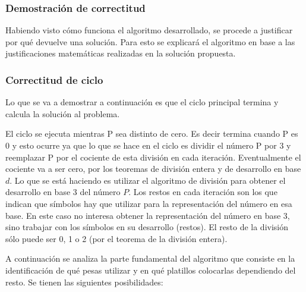 	\subsubsection{Demostración de correctitud}

	Habiendo visto cómo funciona el algoritmo desarrollado, se procede a
	justificar por qué devuelve una solución. Para esto se explicará el algoritmo en base a las justificaciones matemáticas realizadas en la solución propuesta.
	\subsubsection*{Correctitud de ciclo}

	Lo que se va a demostrar a continuación es que el ciclo principal termina y calcula la solución al problema.

	El ciclo se ejecuta mientras P sea distinto de cero. Es decir termina cuando P es 0 y esto ocurre ya que lo que se hace en el ciclo es dividir el número P por 3 y reemplazar P por el cociente de esta división en cada iteración. Eventualmente el cociente va a ser cero, por los teoremas de división entera y de desarrollo en base $d$. Lo que se está haciendo es utilizar el algoritmo de división para obtener el desarrollo en base 3 del número $P$. Los restos en cada iteración son los que indican que símbolos hay que utilizar para la representación del número en esa base. En este caso no interesa obtener la representación del número en base 3, sino trabajar con los símbolos en su desarrollo (restos). El resto de la división sólo puede ser 0, 1 o 2 (por el teorema de la división entera).

	A continuación se analiza la parte fundamental del algoritmo que consiste en la identificación de qué pesas utilizar y en qué platillos colocarlas dependiendo del resto. Se tienen las siguientes posibilidades: 


